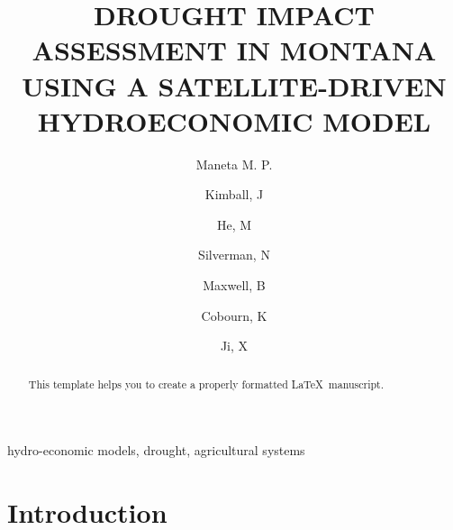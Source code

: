 \documentclass[review]{elsarticle}
\begin{document}
\begin{frontmatter}

\title{DROUGHT IMPACT ASSESSMENT IN MONTANA USING A SATELLITE-DRIVEN HYDROECONOMIC MODEL}

\author[mycorrespondingauthor]{Maneta M. P.}
\author{Kimball, J}
\author{He, M}
\author{Silverman, N}
\address{Geosciences Department, University of Montana, Missoula, MT}

\author{Maxwell, B}

\address{Land Resources and Environmental Sciences, Montana State University, Bozeman, MT}


\author{Cobourn, K}
\author{Ji, X}
\address{Department of Forest Resources and Environmental Conservation, Virginia Tech, Blacksburg, VA}




\begin{abstract}
This template helps you to create a properly formatted \LaTeX\ manuscript.
\end{abstract}

\begin{keyword}
hydro-economic models, drought, agricultural systems
\end{keyword}

\end{frontmatter}

\linenumbers

\section{Introduction}
\end{document}
